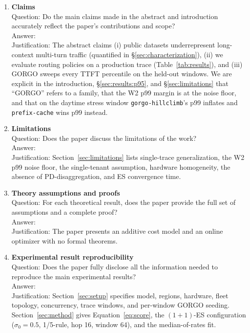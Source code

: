 \documentclass{article}
\begin{document}
\begin{enumerate}

\item {\bf Claims}\\
Question: Do the main claims made in the abstract and introduction accurately reflect the paper's contributions and scope?\\
Answer: \answerYes{}\\
Justification: The abstract claims (i) public datasets underrepresent long-context multi-turn traffic (quantified in \S\ref{sec:characterization}), (ii) we evaluate routing policies on a production trace (Table~\ref{tab:results}), and (iii) GORGO sweeps every TTFT percentile on the held-out windows. We are explicit in the introduction, \S\ref{sec:results:p95}, and \S\ref{sec:limitations} that ``GORGO'' refers to a family, that the W2 p99 margin is at the noise floor, and that on the daytime stress window \texttt{gorgo-hillclimb}'s p99 inflates and \texttt{prefix-cache} wins p99 instead.

\item {\bf Limitations}\\
Question: Does the paper discuss the limitations of the work?\\
Answer: \answerYes{}\\
Justification: Section~\ref{sec:limitations} lists single-trace generalization, the W2 p99 noise floor, the single-tenant assumption, hardware homogeneity, the absence of PD-disaggregation, and ES convergence time.

\item {\bf Theory assumptions and proofs}\\
Question: For each theoretical result, does the paper provide the full set of assumptions and a complete proof?\\
Answer: \answerNA{}\\
Justification: The paper presents an additive cost model and an online optimizer with no formal theorems.

\item {\bf Experimental result reproducibility}\\
Question: Does the paper fully disclose all the information needed to reproduce the main experimental results?\\
Answer: \answerYes{}\\
Justification: Section~\ref{sec:setup} specifies model, regions, hardware, fleet topology, concurrency, trace windows, and per-window GORGO seeding. Section~\ref{sec:method} gives Equation~\ref{eq:score}, the $(1{+}1)$-ES configuration ($\sigma_0=0.5$, 1/5-rule, hop 16, window 64), and the median-of-rates fit. 


\end{enumerate}
\end{document}
